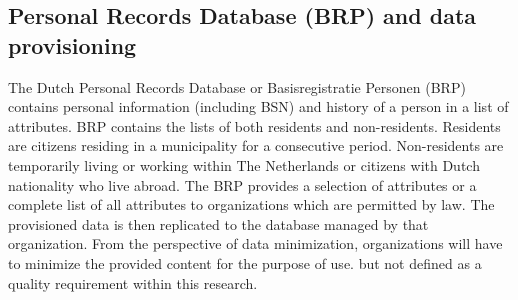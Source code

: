 \subsection{Personal Records Database (BRP) and data provisioning}\label{BRP}
The Dutch Personal Records Database or Basisregistratie Personen (BRP) contains personal information (including BSN) and history of a person in a list of attributes. BRP contains the  lists of both residents and non-residents. Residents are citizens residing in a municipality for a consecutive period. Non-residents are  temporarily living or working within The Netherlands or citizens with Dutch nationality who live abroad. \cite{BRP} The BRP provides a selection of attributes or a complete  list of all attributes to organizations which are permitted by law. The provisioned data is then replicated to the database managed by that organization. From the perspective of data minimization, organizations will have to minimize the provided content for the purpose of use.  
 but not defined as a quality requirement within this research.

